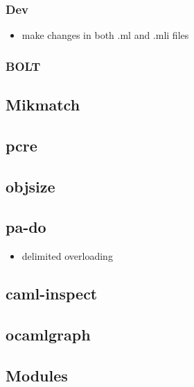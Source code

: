 \documentclass[svgnames,12pt,a4paper]{report}
\begin{document}
\subsubsection{Dev}
\begin{itemize}
\item make changes in both .ml and .mli files
\end{itemize}

\subsubsection{BOLT}
\label{sec:bolt}


\subsection{Mikmatch}
\label{sec:mikmatch}



\subsection{pcre}
\label{sec:pcre}


\subsection{objsize}
\label{sec:objsize}


\subsection{pa-do}
\label{sec:pa-do}

\begin{itemize}
\item delimited overloading
\end{itemize}


\subsection{caml-inspect}
\label{sec:caml-inspect}


\subsection{ocamlgraph}
\label{sec:ocamlgraph}


\subsection{Modules}

\end{document}

